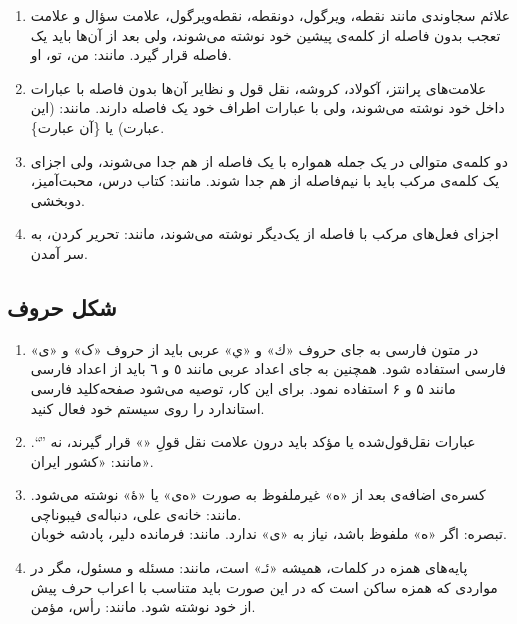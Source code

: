 \begin{enumerate}

\item 
علائم سجاوندی مانند نقطه، ویرگول، دونقطه، نقطه‌ویرگول، علامت سؤال و علامت تعجب %
بدون فاصله از کلمه‌ی پیشین خود نوشته می‌شوند، ولی بعد از آن‌ها باید یک فاصله‌ قرار گیرد. مانند: من، تو، او.
\item 
علامت‌های پرانتز، آکولاد، کروشه، نقل قول و نظایر آن‌ها بدون فاصله با عبارات داخل خود نوشته می‌شوند، ولی با عبارات اطراف خود یک فاصله دارند. مانند: (این عبارت) یا \{آن عبارت\}.
\item 
دو کلمه‌ی متوالی در یک جمله همواره با یک فاصله از هم جدا می‌شوند، ولی اجزای یک کلمه‌ی مرکب باید با نیم‌فاصله‌‌
 از هم جدا شوند. مانند: کتاب درس، محبت‌آمیز، دوبخشی.
 \item 
 اجزای فعل‌های مرکب با فاصله از یک‌دیگر نوشته می‌شوند، مانند: تحریر کردن، به سر آمدن.
\end{enumerate}


\subsection{شکل حروف}

\begin{enumerate}

\item 
در متون فارسی به جای حروف «ك» و «ي» عربی باید از حروف «ک» و «ی» فارسی استفاده شود. همچنین به جای اعداد عربی مانند ٥ و ٦ باید از اعداد فارسی مانند ۵ و ۶ استفاده نمود. 
برای این کار، توصیه می‌شود صفحه‌کلید‌ فارسی استاندارد را روی سیستم خود فعال کنید.
\item 
عبارات نقل‌قول‌شده یا مؤکد باید درون علامت نقل قولِ «» قرار گیرند، نه ''``. مانند: «کشور ایران».
\item 
کسره‌ی اضافه‌ی بعد از «ه» غیرملفوظ به صورت «ه‌ی» یا «هٔ» نوشته می‌شود. مانند: خانه‌ی علی، دنباله‌ی فیبوناچی.
\\
تبصره‌: اگر «ه» ملفوظ باشد، نیاز به «‌ی» ندارد. مانند: فرمانده دلیر، پادشه خوبان. 

\item 
پایه‌های همزه در کلمات، همیشه «ئـ» است، مانند: مسئله و مسئول، مگر در مواردی که همزه ساکن است که در این ‌صورت باید متناسب با اعراب حرف پیش از خود نوشته شود. مانند: رأس، مؤمن. 

\end{enumerate}


